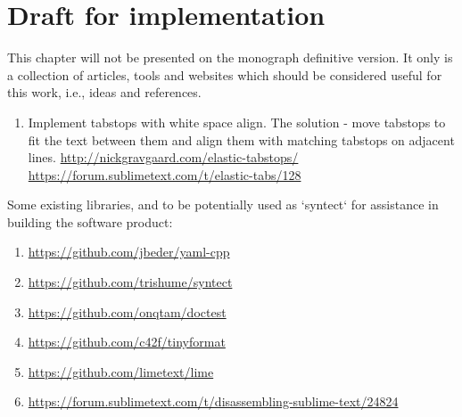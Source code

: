 
%


\chapter{Draft for implementation}

This chapter will not be presented on the monograph definitive version.
It only is a collection of articles,
tools and websites which should be considered useful for this work, i.e., ideas and references.

\medskip
\begin{bluebox}
\begin{enumerate}[leftmargin=*]

    \item Implement tabstops with white space align. The solution - move
    tabstops to fit the text between them and align them with matching tabstops
    on adjacent lines. \url{http://nickgravgaard.com/elastic-tabstops/}
    \url{https://forum.sublimetext.com/t/elastic-tabs/128}

\end{enumerate}
\end{bluebox}

Some existing libraries,
and to be potentially used as `syntect` for assistance in building the software product:

\begin{bluebox}
\begin{enumerate}[leftmargin=*,parsep=0pt]

    \item \url{https://github.com/jbeder/yaml-cpp}
    \item \url{https://github.com/trishume/syntect}
    \item \url{https://github.com/onqtam/doctest}
    \item \url{https://github.com/c42f/tinyformat}
    \item \url{https://github.com/limetext/lime}
    \item \url{https://forum.sublimetext.com/t/disassembling-sublime-text/24824}

\end{enumerate}
\end{bluebox}

